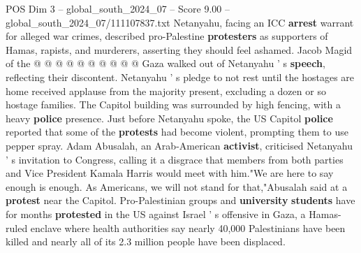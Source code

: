 \begin{textsample}{POS Dim 3 – global\_south\_2024\_07 – Score 9.00 – global\_south\_2024\_07/111107837.txt}
Netanyahu, facing an ICC \textbf{arrest} warrant for alleged war crimes, described pro-Palestine \textbf{protesters} as supporters of Hamas, rapists, and murderers, asserting they should feel ashamed.
Jacob Magid of the @ @ @ @ @ @ @ @ @ @ Gaza walked out of Netanyahu ' s \textbf{speech}, reflecting their discontent.
Netanyahu ' s pledge to not rest until the hostages are home received applause from the majority present, excluding a dozen or so hostage families.
The Capitol building was surrounded by high fencing, with a heavy \textbf{police} presence.
Just before Netanyahu spoke, the US Capitol \textbf{police} reported that some of the \textbf{protests} had become violent, prompting them to use pepper spray.
Adam Abusalah, an Arab-American \textbf{activist}, criticised Netanyahu ' s invitation to Congress, calling it a disgrace that members from both parties and Vice President Kamala Harris would meet with him."We are here to say enough is enough.
As Americans, we will not stand for that,"Abusalah said at a \textbf{protest} near the Capitol.
Pro-Palestinian groups and \textbf{university} \textbf{students} have for months \textbf{protested} in the US against Israel ' s offensive in Gaza, a Hamas-ruled enclave where health authorities say nearly 40,000 Palestinians have been killed and nearly all of its 2.3 million people have been displaced.

\end{textsample}
